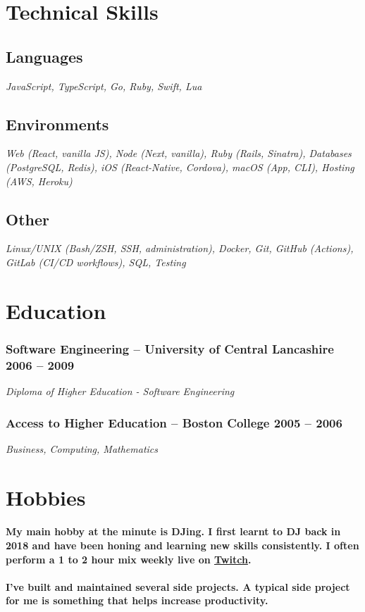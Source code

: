 \documentclass[a4paper]{article}
\newcommand{\datedsubsection}[2]{
  \subsubsection{#1 \hfill \textbf{#2}}
}
\begin{document}
\section{Technical Skills}

\subsection{Languages}
\textit{JavaScript, TypeScript, Go, Ruby, Swift, Lua}

\subsection{Environments}
\textit{Web (React, vanilla JS), Node (Next, vanilla), Ruby (Rails, Sinatra),
Databases (PostgreSQL, Redis), iOS (React-Native, Cordova), macOS (App, CLI),
Hosting (AWS, Heroku)}

\subsection{Other}
\textit{Linux/UNIX (Bash/ZSH, SSH, administration), Docker, Git, GitHub
(Actions), GitLab (CI/CD workflows), SQL, Testing}

\section{Education}

\datedsubsection{\textbf{Software Engineering} -- University of Central
Lancashire}{2006 -- 2009}
\textit{Diploma of Higher Education - Software Engineering}

\datedsubsection{\textbf{Access to Higher Education} -- Boston College}{2005 --
2006}
\textit{Business, Computing, Mathematics}

\section{Hobbies}
\paragraph{My main hobby at the minute is DJing. I first learnt to DJ back in
2018 and have been honing and learning new skills consistently. I often perform
a 1 to 2 hour mix weekly live on \href{https://twitch.tv/iamdjriff}{Twitch}.}

\paragraph{I've built and maintained several side projects. A typical side
project for me is something that helps increase productivity.}
\end{document}

